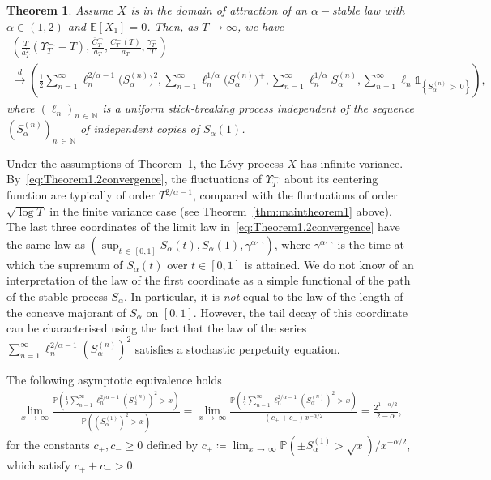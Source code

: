 \documentclass[10pt]{amsart}
\newtheorem{theo}{Theorem}[section]
\theoremstyle{definition}\newtheorem{defi}[theo]{Definition}\newtheorem{rema}[theo]{Remark}\newtheorem{exam}[theo]{Example}\newtheorem{exem}[theo]{Example}\newtheorem{nota}[theo]{Notation}
\newcommand\N{\mathbb{N}}
\newcommand\E{\mathds{E}}
\newcommand\p{\mathds{P}}
\newcommand\1{\mathds{1}}
\newcommand\cid{\xrightarrow{d}}
\newcommand\ov[1]{\overline{#1}}
\begin{document}
\begin{theo}\label{thm:Theorem2}
Assume $X$ is in the domain of attraction of an $\alpha-$stable law with $\alpha\in(1,2)$ and $\E[X_1]=0$. Then, as $T\to\infty$, we have
\begin{equation}\label{eq:Theorem1.2convergence}
\begin{multlined}
\left(\frac{T}{a_T^2}
\left(\Upsilon_T^{\frown}-T \right),
\frac{\ov{C}^\frown_T}{a_T},
\frac{C_T^\frown(T)}{a_T},\frac{\gamma_T^\frown}{T}
\right)\\
\cid\left(\frac{1}{2}\sum_{n=1}^\infty
\ell_n^{2/\alpha-1}\big(S_\alpha^{(n)}\big)^2,
\sum_{n=1}^\infty \ell_n^{1/\alpha}
\big(S_\alpha^{(n)}\big)^+,
\sum_{n=1}^\infty\ell_n^{1/\alpha}S_\alpha^{(n)},
\sum_{n=1}^\infty\ell_n
\1_{\left\{S_\alpha^{(n)}\,>\,0\right\}}
\right),
\end{multlined}
\end{equation}
where $(\ell_n)_{n\,\in\,\N}$ is a uniform stick-breaking process independent of the sequence $(S_\alpha^{(n)})_{n\,\in\,\N}$ of independent copies of $S_\alpha(1)$.
\end{theo}

Under the assumptions of Theorem~\ref{thm:Theorem2}, the Lévy process $X$ has infinite variance. By~\eqref{eq:Theorem1.2convergence}, the fluctuations of $\Upsilon_T^\frown$ about its centering function are typically of order $T^{2/\alpha-1}$, compared with the fluctuations of order $\sqrt{\log T}$ in the finite variance case (see Theorem~\ref{thm:maintheorem1} above). The last three coordinates of the limit law in~\eqref{eq:Theorem1.2convergence} have the same law as $(\sup_{t\,\in\,[0,1]}S_\alpha(t),S_\alpha(1),\gamma^{\alpha\frown})$, where $\gamma^{\alpha\frown}$ is the time at which the supremum of $S_\alpha(t)$ over $t\in[0,1]$ is attained. We do not know of an interpretation of the law of the first coordinate as a simple functional of the path of the stable process $S_\alpha$. In particular, it is \emph{not} equal to the law of the length of the concave majorant of $S_\alpha$ on $[0,1]$. However, the tail decay of this coordinate can be characterised using the fact that the law of the series $\sum_{n=1}^\infty \ell_n^{2/\alpha-1}(S_\alpha^{(n)})^2$ satisfies a stochastic perpetuity equation.

\begin{prop}\label{prop:tailbehaviour}
The following asymptotic equivalence holds
\begin{align*}
\lim_{x\,\to\,\infty}\frac{\p\left(\frac{1}{2}\sum\limits_{n=1}^\infty
\ell_n^{2/\alpha-1}\left(S_\alpha^{(n)}\right)^2>x\right)}{\p\left(\left(S_\alpha^{(1)}\right)^2>x\right)} =\lim_{x\,\to\,\infty}\frac{\p\left(\frac{1}{2}\sum\limits_{n=1}^\infty
\ell_n^{2/\alpha-1}\left(S_\alpha^{(n)}\right)^2>x\right)}{\left(c_+ + c_-\right)x^{-\alpha/2}} =\frac{2^{1-\alpha/2}}{2-\alpha},
\end{align*}
for the constants $c_+,c_-\ge 0$ defined by $c_\pm\coloneqq \lim_{x\,\to\,\infty}\p(\pm S_\alpha^{(1)}>\sqrt{x})/x^{-\alpha/2}$, which satisfy $c_++c_->0$.
\end{prop}
\end{document}
